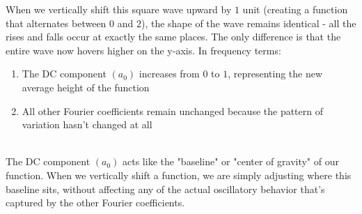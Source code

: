 \documentclass{article}
\begin{document}
When we vertically shift this square wave upward by $1$ unit (creating a function that alternates between $0$ and $2$), the shape of the wave remains identical - all the rises and falls occur at exactly the same places. The only difference is that the entire wave now hovers higher on the y-axis. In frequency terms:

\begin{enumerate}
\item The DC component $(a_0)$ increases from $0$ to $1$, representing the new average height of the function
\item All other Fourier coefficients remain unchanged because the pattern of variation hasn't changed at all
\end{enumerate}\\

The DC component $(a_0)$ acts like the "baseline" or "center of gravity" of our function. When we vertically shift a function, we are simply adjusting where this baseline sits, without affecting any of the actual oscillatory behavior that's captured by the other Fourier coefficients.
\end{document}
